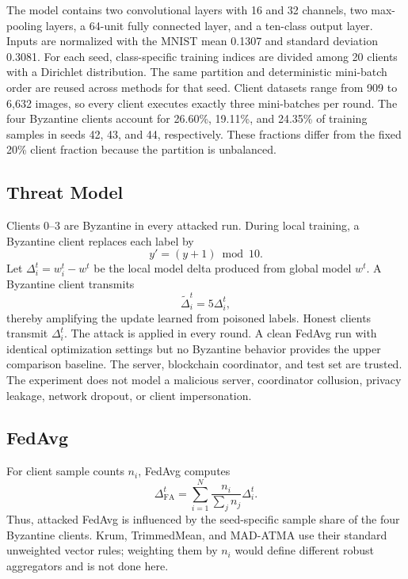 \documentclass[10pt,letterpaper]{article}
\begin{document}
The model contains two convolutional layers with 16 and 32 channels, two
max-pooling layers, a 64-unit fully connected layer, and a ten-class output
layer. Inputs are normalized with the MNIST mean 0.1307 and standard deviation
0.3081. For each seed, class-specific training indices are divided among 20
clients with a Dirichlet distribution. The same partition and deterministic
mini-batch order are reused across methods for that seed. Client datasets range
from 909 to 6,632 images, so every client executes exactly three mini-batches
per round. The four Byzantine clients account for 26.60\%, 19.11\%, and
24.35\% of training samples in seeds 42, 43, and 44, respectively. These
fractions differ from the fixed 20\% client fraction because the partition is
unbalanced.

\subsection{Threat Model}

Clients 0--3 are Byzantine in every attacked run. During local training, a
Byzantine client replaces each label by
\begin{equation}
y'=(y+1)\bmod 10.
\end{equation}
Let $\Delta_i^t=w_i^t-w^t$ be the local model delta produced from global model
$w^t$. A Byzantine client transmits
\begin{equation}
\widetilde{\Delta}_i^t=5\Delta_i^t,
\end{equation}
thereby amplifying the update learned from poisoned labels. Honest clients
transmit $\Delta_i^t$. The attack is applied in every round. A clean FedAvg run
with identical optimization settings but no Byzantine behavior provides the
upper comparison baseline. The server, blockchain coordinator, and test set are
trusted. The experiment does not model a malicious server, coordinator
collusion, privacy leakage, network dropout, or client impersonation.

\subsection{FedAvg}

For client sample counts $n_i$, FedAvg computes
\begin{equation}
\Delta_{\mathrm{FA}}^t =
\sum_{i=1}^{N}\frac{n_i}{\sum_j n_j}\Delta_i^t.
\end{equation}
Thus, attacked FedAvg is influenced by the seed-specific sample share of the
four Byzantine clients. Krum, TrimmedMean, and MAD-ATMA use their standard
unweighted vector rules; weighting them by $n_i$ would define different robust
aggregators and is not done here.
\end{document}
